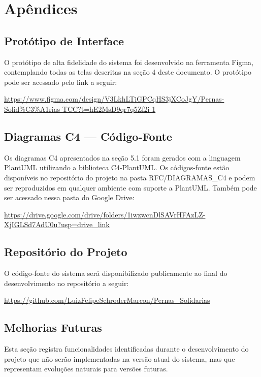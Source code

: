 \documentclass[12pt,a4paper]{article}
\begin{document}
\section{Apêndices}


\subsection{Protótipo de Interface}

O protótipo de alta fidelidade do sistema foi desenvolvido na ferramenta Figma, contemplando todas as telas descritas na seção 4 deste documento. O protótipo pode ser acessado pelo link a seguir:
\begin{center}
    \url{https://www.figma.com/design/V3LkhLTiGPCqHS3jXCoJgY/Pernas-Solid%C3%A1rias-TCC?t=hE2MsD9qr7q5Zf2i-1}
\end{center}

\subsection{Diagramas C4 — Código-Fonte}
Os diagramas C4 apresentados na seção 5.1 foram gerados com a linguagem PlantUML utilizando a biblioteca C4-PlantUML. Os códigos-fonte estão disponíveis no repositório do projeto na pasta RFC/DIAGRAMAS\_C4 e podem ser reproduzidos em qualquer ambiente com suporte a PlantUML. Também pode ser acessado nessa pasta do Google Drive: 
\begin{center}
        \url{https://drive.google.com/drive/folders/1iwzwcnDlSAVrHFAzLZ-XjIGLSd7AdU0u?usp=drive_link}
    \end{center}

\subsection{Repositório do Projeto}
O código-fonte do sistema será disponibilizado publicamente ao final do
desenvolvimento no repositório a seguir:
\begin{center}
    \url{https://github.com/LuizFelipeSchroderMarcon/Pernas_Solidarias}
\end{center}

\subsection{Melhorias Futuras}

Esta seção registra funcionalidades identificadas durante o desenvolvimento do projeto que não serão implementadas na versão atual do sistema, mas que representam evoluções naturais para versões futuras.
\end{document}
